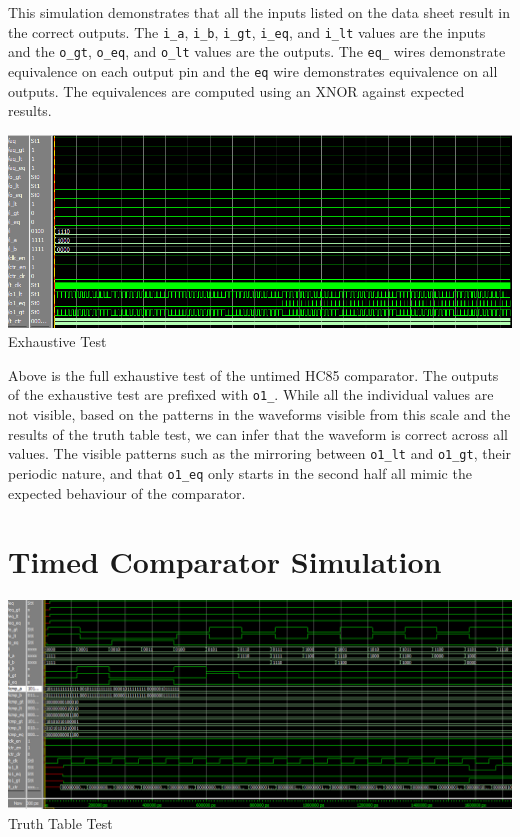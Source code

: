 \documentclass[12pt,letterpaper,titlepage]{article}
\begin{document}
\begin{raggedright}
This simulation demonstrates that all the inputs listed on the data sheet result in the correct outputs. The \texttt{i\_a}, \texttt{i\_b}, \texttt{i\_gt}, \texttt{i\_eq}, and \texttt{i\_lt} values are the inputs and the \texttt{o\_gt}, \texttt{o\_eq}, and \texttt{o\_lt} values are the outputs. The \texttt{eq\_} wires demonstrate equivalence on each output pin and the \texttt{eq} wire demonstrates equivalence on all outputs. The equivalences are computed using an XNOR against expected results.

\begin{center}
\includegraphics[width=\textwidth]{tb_ut_exh}
Exhaustive Test
\end{center}

Above is the full exhaustive test of the untimed HC85 comparator. The outputs of the exhaustive test are prefixed with \texttt{o1\_}. While all the individual values are not visible, based on the patterns in the waveforms visible from this scale and the results of the truth table test, we can infer that the waveform is correct across all values. The visible patterns such as the mirroring between \texttt{o1\_lt} and \texttt{o1\_gt}, their periodic nature, and that \texttt{o1\_eq} only starts in the second half all mimic the expected behaviour of the comparator.

\clearpage

\section{Timed Comparator Simulation}
\begin{center}
\includegraphics[width=\textwidth]{tb_red}
Truth Table Test
\end{center}


\end{raggedright}
\end{document}
